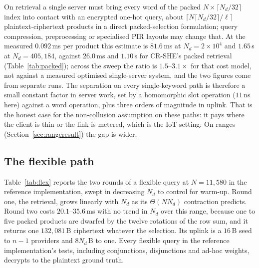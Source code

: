 \documentclass[a4paper,fleqn]{cas-sc}
\begin{document}
On retrieval a single server must bring every word of the packed
$N\times\lceil N_d/32\rceil$ index into contact with an encrypted one-hot
query, about $\lceil N\lceil N_d/32\rceil/\ell\rceil$ plaintext-ciphertext
products in a direct packed-selection formulation; query compression,
preprocessing or specialised PIR layouts may change that. At the measured
$0.092$\,ms per product this estimate is $81.6$\,ms at
$N_d=2\times10^4$ and $1.65$\,s at $N_d=405{,}184$, against $26.0$\,ms and
$1.10$\,s for CR-SHE's packed retrieval (Table~\ref{tab:packed}); across the
sweep the ratio is $1.5$--$3.1\times$ for that cost model, not against a
measured optimised single-server system, and the two figures come from separate
runs. The separation on every single-keyword path is therefore a small constant
factor in server work, set by a homomorphic slot operation ($11$\,ns here)
against a word operation, plus three orders of magnitude in uplink. That is the
honest case for the non-collusion assumption on these paths: it pays where the
client is thin or the link is metered, which is the IoT setting. On ranges
(Section~\ref{sec:rangeresult}) the gap is wider.

\subsection{The flexible path}
\label{sec:flexresult}
Table~\ref{tab:flex} reports the two rounds of a flexible query at
$N=11{,}580$ in the reference implementation, swept in decreasing $N_d$ to
control for warm-up. Round one, the retrieval, grows linearly with $N_d$ as
its $\Theta(NN_d)$ contraction predicts. Round two costs $20.1$--$35.6$\,ms
with no trend in $N_d$ over this range, because one to five packed products are
dwarfed by the twelve rotations of the row sum, and it returns one
$132{,}081$\,B ciphertext whatever the selection. Its uplink is a $16$\,B seed
to $n-1$ providers and $8N_d$\,B to one. Every flexible query in the reference implementation's tests, including
conjunctions, disjunctions and ad-hoc weights, decrypts to the plaintext ground
truth.
\end{document}
